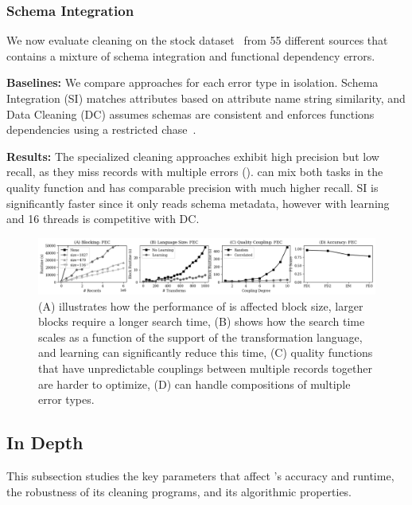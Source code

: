 \subsubsection{Schema Integration}
We now evaluate cleaning on the stock dataset~\cite{data-flights} from 55 different sources that contains a mixture of schema integration and functional dependency errors.

\vspace{0.5em}\noindent\textbf{Baselines: } We compare approaches for each error type in isolation.  Schema Integration  (SI) matches attributes based on attribute name string similarity, and Data Cleaning (DC) assumes schemas are consistent and enforces functions dependencies using a restricted chase~\cite{benedikt2017benchmarking}.

\vspace{0.5em}\noindent\textbf{Results: } The specialized cleaning approaches exhibit high precision but low recall, as they miss records with multiple errors ().  \sys can mix both tasks in the quality function and has comparable precision with much higher recall.  SI is significantly faster since it only reads schema metadata, however \sys with learning and 16 threads is competitive with DC.  
\begin{figure}[ht]
\centering
 \includegraphics[width=\textwidth]{exp/exp4.png}
 \caption{(A) illustrates how the performance of \sys is affected block size, larger blocks require a longer search time, (B) shows how the search time scales as a function of the support of the transformation language, and learning can significantly reduce this time, (C) quality functions that have unpredictable couplings between multiple records together are harder to optimize, (D) \sys can handle compositions of multiple error types.
 \label{fig:microbenchmarks}}
\end{figure}

\subsection{\sys In Depth}
This subsection studies the key parameters that affect \sys's accuracy and runtime, the robustness of its cleaning programs, and its algorithmic properties.

